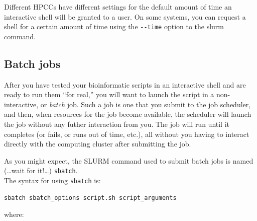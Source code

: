 \documentclass[]{krantz}
\begin{document}
Different HPCCs have different settings for the default amount of time an interactive shell will be
granted to a user. On some systems, you can request a shell for a certain amount of time using the
\texttt{-\/-time} option to the slurm command.

\hypertarget{slurm-batch}{%
\subsection{Batch jobs}\label{slurm-batch}}

After you have tested your bioinformatic scripts in an interactive shell and are ready to
run them ``for real,'' you will want to launch the script in a non-interactive, or \emph{batch} job.
Such a job is one that you submit to the job scheduler, and then, when resources for the job become available,
the scheduler will launch the job without any futher interaction from you. The job will run until
it completes (or fails, or runs out of time, etc.), all without you having to interact directly
with the computing cluster after submitting the job.

As you might expect, the SLURM command used to submit batch jobs is named (\ldots{}wait for it!\ldots{}) \texttt{sbatch}.\\
The syntax for using \texttt{sbatch} is:

\begin{verbatim}
sbatch sbatch_options script.sh script_arguments
\end{verbatim}

where:
\end{document}
